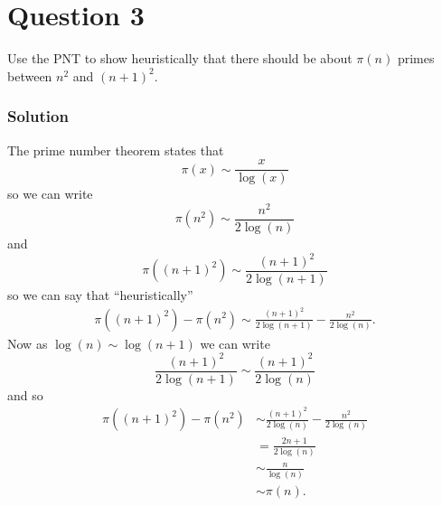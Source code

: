 \documentclass{unswmaths}
\begin{document}
\section*{Question 3}

Use the PNT to show heuristically that there should be about $ \pi(n) $ primes between $ n^2 $ and $ (n+1)^2 $.

\subsubsection*{Solution}

The prime number theorem states that
$$
	\pi(x) \sim \frac{x}{\log(x)}
$$
so we can write
$$
	\pi(n^2) \sim \frac{n^2}{2\log(n)}
$$
and
$$
	\pi((n+1)^2) \sim \frac{(n+1)^2}{2\log(n+1)}
$$
so we can say that ``heuristically''
\begin{align*}
	\pi((n+1)^2) - \pi(n^2) \sim  \frac{(n+1)^2}{2\log(n+1)} - \frac{n^2}{2\log(n)}.
\end{align*}
Now as $ \log(n) \sim \log(n+1) $ we can write
$$
	\frac{(n+1)^2}{2\log(n+1)} \sim \frac{(n+1)^2}{2 \log(n)}
$$
and so
\begin{align*}
	\pi((n+1)^2) - \pi(n^2) &\sim  \frac{(n+1)^2}{2\log(n)} - \frac{n^2}{2\log(n)} \\
		&= \frac{2n + 1}{2 \log(n)} \\
		&\sim \frac{n}{\log(n)} \\
		&\sim \pi(n).
\end{align*}
\end{document}
